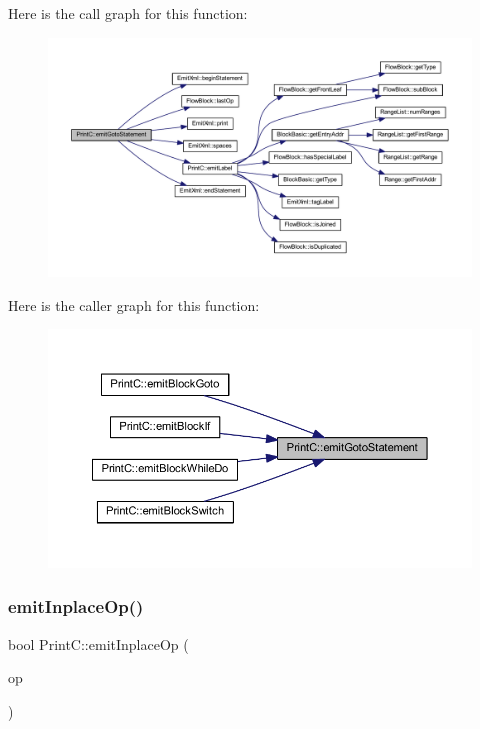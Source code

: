 Here is the call graph for this function\+:
\nopagebreak
\begin{figure}[H]
\begin{center}
\leavevmode
\includegraphics[width=350pt]{class_print_c_afd7a9bbef5548e06712bd84e130b89f8_cgraph}
\end{center}
\end{figure}
Here is the caller graph for this function\+:
\nopagebreak
\begin{figure}[H]
\begin{center}
\leavevmode
\includegraphics[width=350pt]{class_print_c_afd7a9bbef5548e06712bd84e130b89f8_icgraph}
\end{center}
\end{figure}
\mbox{\label{class_print_c_aa1189e40787980076c6827bb4e20fbef}} 
\subsubsection{\texorpdfstring{emitInplaceOp()}{emitInplaceOp()}}
{\footnotesize\ttfamily bool Print\+C\+::emit\+Inplace\+Op (\begin{DoxyParamCaption}\item[{const \mbox{\hyperlink{class_pcode_op}{Pcode\+Op}} $\ast$}]{op }\end{DoxyParamCaption})\hspace{0.3cm}{\ttfamily [protected]}}



